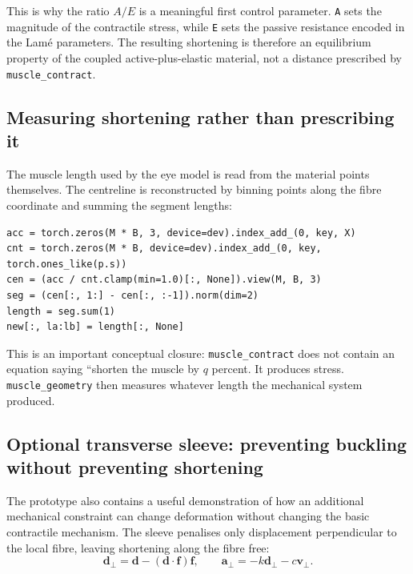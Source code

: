 \documentclass[11pt]{article}
\begin{document}
This is why the ratio $A/E$ is a meaningful first control parameter. \texttt{A} sets the magnitude of the contractile stress, while \texttt{E} sets the passive resistance encoded in the Lamé parameters. The resulting shortening is therefore an equilibrium property of the coupled active-plus-elastic material, not a distance prescribed by \texttt{muscle\_contract}.

\subsection{Measuring shortening rather than prescribing it}

The muscle length used by the eye model is read from the material points themselves. The centreline is reconstructed by binning points along the fibre coordinate and summing the segment lengths:

\begin{lstlisting}[caption={\texttt{prototype/eye/muscle\_ops.py}: current muscle length is an aggregate readout from material-point positions.},label={lst:length-code}]
acc = torch.zeros(M * B, 3, device=dev).index_add_(0, key, X)
cnt = torch.zeros(M * B, device=dev).index_add_(0, key, torch.ones_like(p.s))
cen = (acc / cnt.clamp(min=1.0)[:, None]).view(M, B, 3)
seg = (cen[:, 1:] - cen[:, :-1]).norm(dim=2)
length = seg.sum(1)
new[:, la:lb] = length[:, None]
\end{lstlisting}

This is an important conceptual closure: \texttt{muscle\_contract} does not contain an equation saying ``shorten the muscle by $q$ percent. It produces stress. \texttt{muscle\_geometry} then measures whatever length the mechanical system produced.

\subsection{Optional transverse sleeve: preventing buckling without preventing shortening}

The prototype also contains a useful demonstration of how an additional mechanical constraint can change deformation without changing the basic contractile mechanism. The sleeve penalises only displacement perpendicular to the local fibre, leaving shortening along the fibre free:
\begin{equation}
\mathbf d_\perp
=
\mathbf d-(\mathbf d\cdot\mathbf f)\mathbf f,
\qquad
\mathbf a_\perp=-k\mathbf d_\perp-c\mathbf v_\perp.
\label{eq:auto37}
\end{equation}
\end{document}
